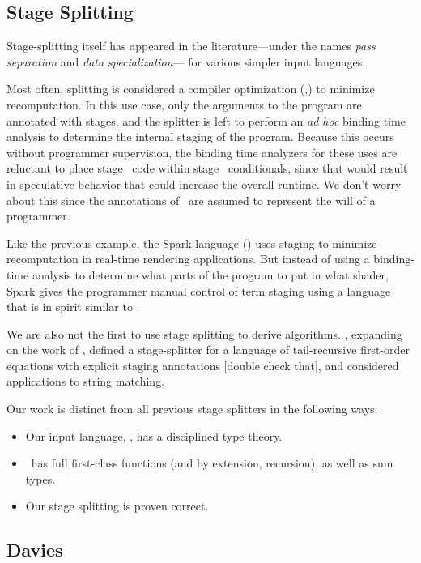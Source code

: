 \subsection{Stage Splitting}

Stage-splitting itself has appeared in the literature---under 
the names {\em pass separation} and {\em data specialization}--- for various simpler input languages.

Most often, splitting is considered a compiler optimization (\cite{jorring86},\cite{knoblock96})
to minimize recomputation.
In this use case, only the arguments to the program are annotated with stages, 
and the splitter is left to perform an {\em ad hoc} binding time analysis to determine the 
internal staging of the program.
Because this occurs without programmer supervision, the binding time analyzers for these uses are 
reluctant to place stage \bbone\ code within stage \bbtwo\ conditionals, 
since that would result in speculative behavior that could increase the overall runtime.
We don't worry about this since the annotations of \lang\ are assumed to represent the will of a programmer.

Like the previous example, the Spark language (\cite{sparkThesis}) uses staging to minimize recomputation in real-time rendering applications.  
But instead of using a binding-time analysis to determine what parts of the program to put in what shader, 
Spark gives the programmer manual control of term staging using a language that is in spirit similar to \lang. 

We are also not the first to use stage splitting to derive algorithms.
\cite{malmkjaer89}, expanding on the work of \cite{barzdins88}, defined a stage-splitter
for a language of tail-recursive first-order equations with explicit staging annotations [double check that],
and considered applications to string matching.

Our work is distinct from all previous stage splitters in the following ways:
\begin{itemize}
\item Our input language, \lang, has a disciplined type theory.
\item \lang\ has full first-class functions (and by extension, recursion), as well as sum types.
\item Our stage splitting is proven correct.
\end{itemize}

\subsection{Davies}


